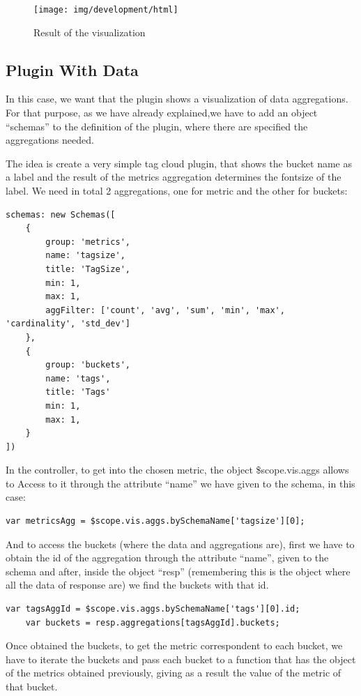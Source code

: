\documentclass[a4paper, 12pt]{book}
\begin{document}
\begin{figure}[H]
  \centering
  \texttt{[image: img/development/html]}
  \caption{Result of the visualization}
  \label{fig:pluginhtml}
\end{figure}


\subsection{Plugin With Data}

In this case, we want that the plugin shows a visualization of data aggregations. For that purpose, as we have already explained,we have to add an object “schemas” to the definition of the plugin, where there are specified the aggregations needed.

The idea is create a very simple tag cloud plugin, that shows the bucket name as a label and the result of the metrics aggregation determines the fontsize of the label. We need in total 2 aggregations, one for metric and the other for buckets:

\begin{lstlisting}[frame=single]
schemas: new Schemas([
	{
		group: 'metrics',
		name: 'tagsize',
		title: 'TagSize',
		min: 1,
		max: 1,
		aggFilter: ['count', 'avg', 'sum', 'min', 'max', 'cardinality', 'std_dev']
	},
	{
		group: 'buckets',
		name: 'tags',
		title: 'Tags'
		min: 1,
		max: 1,
	}
])
\end{lstlisting}

In the controller, to get into the chosen metric, the object \$scope.vis.aggs allows to Access to it through the attribute “name” we have given to the schema, in this case:

\begin{lstlisting}[frame=single]
	var metricsAgg = $scope.vis.aggs.bySchemaName['tagsize'][0];
\end{lstlisting}

And to access the buckets (where the data and aggregations are), first we have to obtain the id of the aggregation through the attribute “name”, given to the schema and after, inside the object “resp” (remembering this is the object where all the data of response are) we find the buckets with that id.

\begin{lstlisting}[frame=single]
	var tagsAggId = $scope.vis.aggs.bySchemaName['tags'][0].id;
	var buckets = resp.aggregations[tagsAggId].buckets;
\end{lstlisting}

Once obtained the buckets, to get the metric correspondent to each bucket, we have to iterate the buckets and pass each bucket to a function that has the object of the metrics obtained previously, giving as a result the value of the metric of that bucket.
\end{document}
